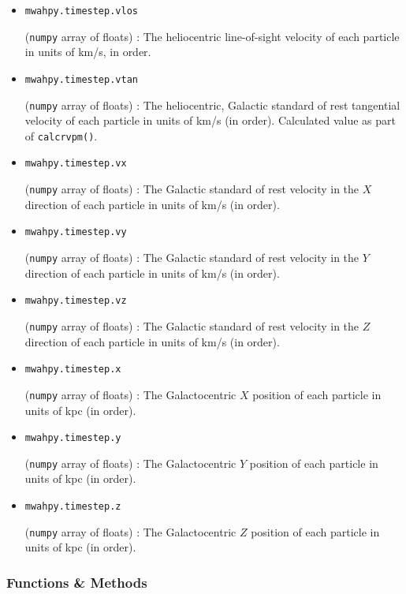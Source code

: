 \documentclass{article}
\begin{document}
\begin{itemize}
\item \verb!mwahpy.timestep.vlos!

(\verb!numpy! array of floats) : The heliocentric line-of-sight velocity of each particle in units of km/s, in order.

\item \verb!mwahpy.timestep.vtan!

(\verb!numpy! array of floats) : The heliocentric, Galactic standard of rest tangential velocity of each particle in units of km/s (in order). Calculated value as part of \verb!calcrvpm()!.

\item \verb!mwahpy.timestep.vx!

(\verb!numpy! array of floats) : The Galactic standard of rest velocity in the $X$ direction of each particle in units of km/s (in order). 

\item \verb!mwahpy.timestep.vy!

(\verb!numpy! array of floats) : The Galactic standard of rest velocity in the $Y$ direction of each particle in units of km/s (in order). 

\item \verb!mwahpy.timestep.vz!

(\verb!numpy! array of floats) : The Galactic standard of rest velocity in the $Z$ direction of each particle in units of km/s (in order).  

\item \verb!mwahpy.timestep.x!

(\verb!numpy! array of floats) : The Galactocentric $X$ position of each particle in units of kpc (in order). 

\item \verb!mwahpy.timestep.y!

(\verb!numpy! array of floats) : The Galactocentric $Y$ position of each particle in units of kpc (in order). 

\item \verb!mwahpy.timestep.z!

(\verb!numpy! array of floats) : The Galactocentric $Z$ position of each particle in units of kpc (in order). 


\end{itemize}

\subsubsection{Functions \& Methods}
\end{document}
